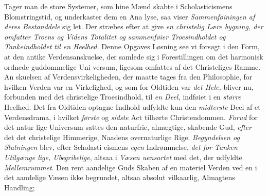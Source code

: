 Tager man de store Systemer, som hine Mænd skabte i
Scholasticismens Blomstringstid, og underkaster dem en Ana\-%
lyse, saa viser \emph{Sammenføiningen af deres Bestanddele}
sig let. Der stræbes efter at give \emph{en christelig Lære\-%
bygning, der omfatter Troens og Videns Totalitet
og sammenføier Troesindholdet og Tankeindholdet
til en Heelhed.} Denne Opgaves Løsning see vi forsøgt i
den Form, at den antike Verdensanskuelse, der samlede sig i
Forestillingen om det harmonisk ordnede guddommelige Uni\-%
versum, ligesom omfattes af det Christeliges Ramme. An\-%
skuelsen af Verdensvirkeligheden, der maatte tages fra den
Philosophie, for hvilken Verden var en Virkelighed, og som
for Oldtiden var \emph{det Hele,} bliver nu, forbunden med det
christelige Troesindhold, til \emph{en Deel,} indføiet i en \emph{større}
Heelhed. Det fra Oldtiden optagne Indhold udfyldte kun den
\emph{midterste} Deel af et Verdensdrama, i hvilket \emph{første} og
\emph{sidste} Act tilhørte Christendommen. \emph{Forud} for det natur\-%
lige Universum sattes den naturfrie, almægtige, skabende Gud,
\emph{efter} det det christelige Himmerige, Naadens overnaturlige
Rige. \emph{Begyndelsen og Slutningen} blev, efter Scholasti\-%
cismens \emph{egen} Indrømmelse, \emph{det for Tanken Utilgænge\-%
lige, Ubegribelige}, altsaa i \emph{Væsen uensartet} med det,
der udfyldte \emph{Mellemrummet}. Den rent aandelige Guds
Skaben af en materiel Verden ved en i det aandelige Væsen
ikke begrundet, altsaa absolut vilkaarlig, Almagtens Handling;
